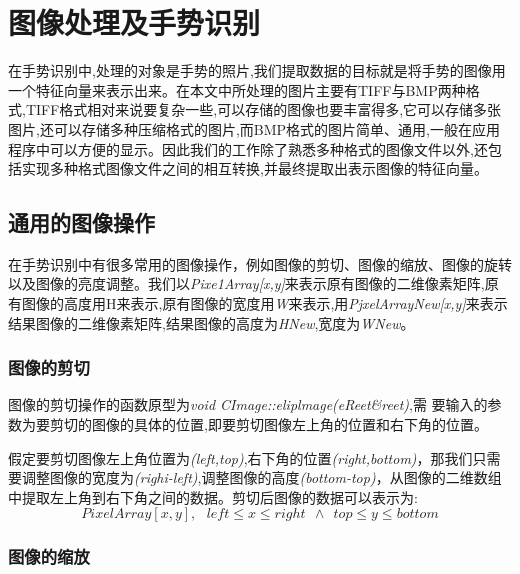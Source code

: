 \documentclass{XDBAthesis}
\begin{document}
\else
\fi
{}

\lstset{numbers=left,
extendedchars=false,
escapechar=@,style=customc
}
\chapter{图像处理及手势识别}

在手势识别中,处理的对象是手势的照片,我们提取数据的目标就是将手势的图像用一个特征向量来表示出来。在本文中所处理的图片主要有TIFF与BMP两种格式,TIFF格式相对来说要复杂一些,可以存储的图像也要丰富得多,它可以存储多张图片,还可以存储多种压缩格式的图片,而BMP格式的图片简单、通用,一般在应用程序中可以方便的显示。因此我们的工作除了熟悉多种格式的图像文件以外,还包括实现多种格式图像文件之间的相互转换,并最终提取出表示图像的特征向量。

\section{通用的图像操作}

    在手势识别中有很多常用的图像操作，例如图像的剪切、图像的缩放、图像的旋转以及图像的亮度调整。我们以\emph{Pixe1Array[x,y]}来表示原有图像的二维像素矩阵,原有图像的高度用H来表示,原有图像的宽度用\emph{W}来表示,用\emph{PjxelArrayNew[x,y]}来表示结果图像的二维像素矩阵,结果图像的高度为\emph{HNew},宽度为\emph{WNew}。

\subsection{图像的剪切}

    图像的剪切操作的函数原型为\emph{void CImage::eliplmage(eReet\&reet)},需
要输入的参数为要剪切的图像的具体的位置,即要剪切图像左上角的位置和右下角的位置。

假定要剪切图像左上角位置为\emph{(left,top)},右下角的位置\emph{(right,bottom)}，那我们只需要调整图像的宽度为\emph{(righi-left)},调整图像的高度\emph{(bottom-top)}，从图像的二维数组中提取左上角到右下角之间的数据。剪切后图像的数据可以表示为:
$$
    PixelArray[x,y] ,\ \ \ left\leq x \leq right \ \ \wedge\ \  top \leq y \leq bottom
$$
\subsection{图像的缩放}
\end{document}
